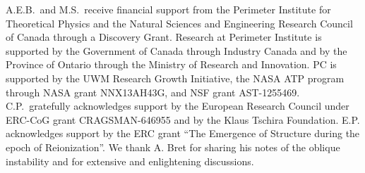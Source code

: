 \documentclass[usenatbib,iop,apj,numberedappendix]{aeb_emulateapj_2015}
\newcommand{\epm}{\ensuremath{e^+e^-}}
\begin{document}

\acknowledgements
A.E.B.~and M.S.~receive financial support from the Perimeter
Institute for Theoretical Physics and the Natural Sciences and
Engineering Research Council of Canada through a Discovery Grant.
Research at Perimeter Institute is supported by the Government of
Canada through Industry Canada and by the Province of Ontario through
the Ministry of Research and Innovation.
PC is supported by the UWM Research Growth Initiative, the NASA ATP
program through NASA grant NNX13AH43G, and NSF grant AST-1255469.
C.P.~gratefully acknowledges support by the European Research Council under ERC-CoG grant CRAGSMAN-646955 and by the Klaus Tschira Foundation.
E.P. acknowledges support by the ERC grant ``The Emergence of Structure during the epoch of Reionization''.
We thank A. Bret for sharing his notes of the oblique instability and for extensive and enlightening discussions. 
\end{document}
